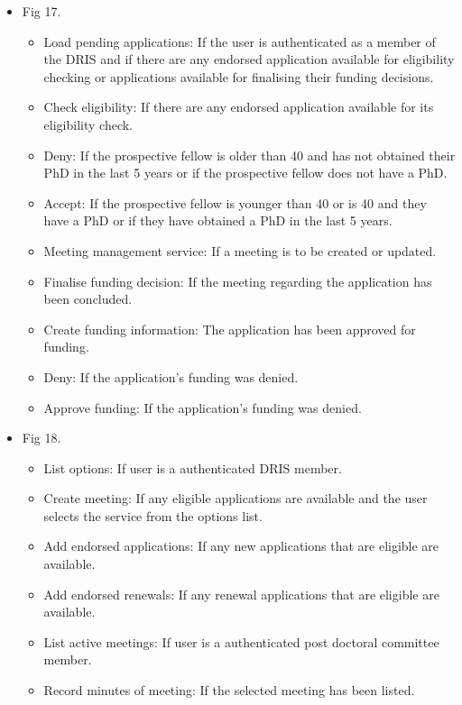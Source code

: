 \documentclass[12pt]{article}
\begin{document}
\begin{itemize}
	\item Fig 17.
		\begin{itemize}
			\item Load pending applications: If the user is authenticated as a member of the DRIS and if there are any endorsed application available for eligibility checking or applications available for finalising their funding decisions.
			\item Check eligibility: If there are any endorsed application available for its eligibility check.
			\item Deny: If the prospective fellow is older than 40 and has not obtained their PhD in the last 5 years or if the prospective fellow does not have a PhD.
			\item Accept: If the prospective fellow is younger than 40 or is 40 and they have a PhD or if they have obtained a PhD in the last 5 years.
			\item Meeting management service: If a meeting is to be created or updated. 
			\item Finalise funding decision: If the meeting regarding the application has been concluded.
			\item Create funding information: The application has been approved for funding.	
			\item Deny: If the application's funding was denied.			
			\item Approve funding: If the application's funding was denied.									
		\end{itemize}
	
	\item Fig 18.
		\begin{itemize}
			\item List options: If user is a authenticated DRIS member.
			\item Create meeting: If any eligible applications are available and the user selects the service from the options list.
			\item Add endorsed applications: If any new applications that are eligible are available.
			\item Add endorsed renewals: If any renewal applications that are eligible are available.
			\item List active meetings: If user is a authenticated post doctoral committee member.
			\item Record minutes of meeting: If the selected meeting has been listed.							
		\end{itemize}
	\end{itemize}
\end{document}
